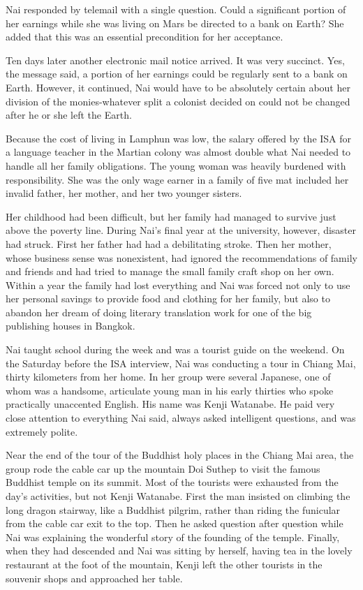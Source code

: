 \documentclass[]{article}
\begin{document}
{Nai responded by telemail with a single question.  Could a significant portion of her earnings while she was living on Mars be directed to a bank on Earth? She added that this was an essential precondition for her acceptance.

Ten days later another electronic mail notice arrived.  It was very succinct.  Yes, the message said, a portion of her earnings could be regularly sent to a bank on Earth.  However, it continued, Nai would have to be absolutely certain about her division of the monies-whatever split a colonist decided on could not be changed after he or she left the Earth.

Because the cost of living in Lamphun was low, the salary offered by the ISA for a language teacher in the Martian colony was almost double what Nai needed to handle all her family obligations.  The young woman was heavily burdened with responsibility.  She was the only wage earner in a family of five mat included her invalid father, her mother, and her two younger sisters.

Her childhood had been difficult, but her family had managed to survive just above the poverty line.  During Nai’s final year at the university, however, disaster had struck.  First her father had had a debilitating stroke.  Then her mother, whose business sense was nonexistent, had ignored the recommendations of family and friends and had tried to manage the small family craft shop on her own.  Within a year the family had lost everything and Nai was forced not only to use her personal savings to provide food and clothing for her family, but also to abandon her dream of doing literary translation work for one of the big publishing houses in Bangkok.

Nai taught school during the week and was a tourist guide on the weekend.  On the Saturday before the ISA interview, Nai was conducting a tour in Chiang Mai, thirty kilometers from her home.  In her group were several Japanese, one of whom was a handsome, articulate young man in his early thirties who spoke practically unaccented English.  His name was Kenji Watanabe.  He paid very close attention to everything Nai said, always asked intelligent questions, and was extremely polite.

Near the end of the tour of the Buddhist holy places in the Chiang Mai area, the group rode the cable car up the mountain Doi Suthep to visit the famous Buddhist temple on its summit.  Most of the tourists were exhausted from the day’s activities, but not Kenji Watanabe.  First the man insisted on climbing the long dragon stairway, like a Buddhist pilgrim, rather than riding the funicular from the cable car exit to the top.  Then he asked question after question while Nai was explaining the wonderful story of the founding of the temple.  Finally, when they had descended and Nai was sitting by herself, having tea in the lovely restaurant at the foot of the mountain, Kenji left the other tourists in the souvenir shops and approached her table.

}
\end{document}
